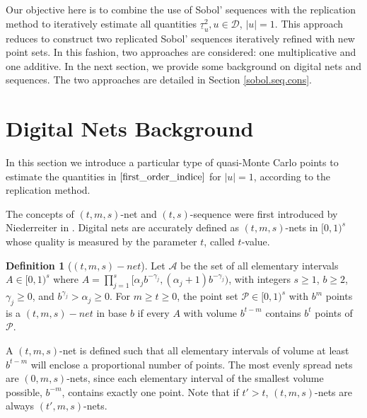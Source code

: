 \documentclass[]{elsarticle}
\theoremstyle{definition}
\newtheorem{defin}{Definition}
\newcommand{\cube}{[0,1)^s}
\newcommand{\bvec}[1]{\boldsymbol{#1}}
\newcommand{\vx}{\bvec{x}}
\def\abs#1{\ensuremath{\left \lvert #1 \right \rvert}}
\begin{document}
Our objective here is to combine the use of Sobol' sequences \cite{sobolseq} with the replication method to iteratively estimate all quantities $\underline{\tau}_u^2, u \in \mathcal{D}$, $\abs{u}=1$. This approach reduces to construct two replicated Sobol' sequences iteratively refined with new point sets. In this fashion, two approaches are considered: one multiplicative and one additive. In the next section, we provide some background on digital nets and sequences. The two approaches are detailed in Section \ref{sobol.seq.cons}.

\section{Digital Nets Background}

In this section we introduce a particular type of quasi-Monte Carlo points to estimate the quantities in $\eqref{first_order_indice}$ for $\abs{u}=1$, according to the replication method. 

The concepts of $(t,m,s)$-net and $(t,s)$-sequence were first introduced by Niederreiter in \cite{niederreiter}. Digital nets are accurately defined as $(t,m,s)$-nets in $\cube$ whose quality is measured by the parameter $t$, called $t$-value. %
\begin{defin}[$(t,m,s)-net$]
Let $\mathcal{A}$ be the set of all elementary intervals $A\in\cube$ where $A=\prod_{j=1}^s [\alpha_jb^{-\gamma_j},(\alpha_j+1)b^{-\gamma_j})$, with integers $s\geq 1$, $b\geq 2$, $\gamma_j\geq 0$, and $b^{\gamma_j}>\alpha_j\geq 0$. For $m\geq t\geq 0$, the point set $\mathcal{P}\in\cube$ with $b^m$ points is a $(t,m,s)-net$ in base $b$ if every $A$ with volume $b^{t-m}$ contains $b^t$ points of $\mathcal{P}$.
\end{defin}

A $(t,m,s)$-net is defined such that all elementary intervals of volume at least $b^{t-m}$ will enclose a proportional number of points. The most evenly spread nets are $(0,m,s)$-nets, since each elementary interval of the smallest volume possible, $b^{-m}$, contains exactly one point. Note that if $t'>t$, $(t,m,s)$-nets are always $(t',m,s)$-nets.
\end{document}
